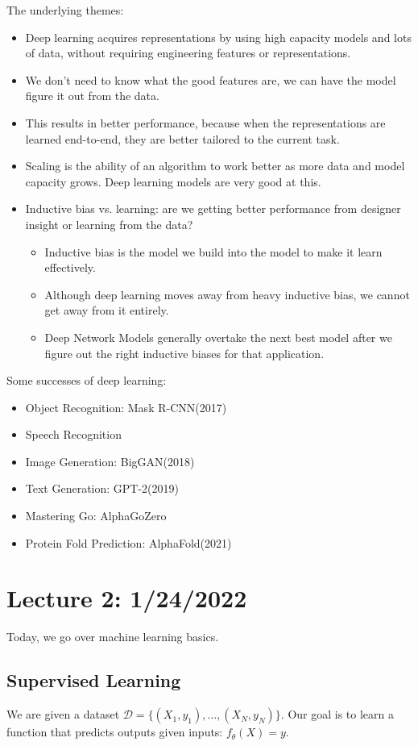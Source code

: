 \documentclass[11pt]{scrartcl}
\let \mc \mathcal
\newcommand{\1}{\textbf{1}} %
\begin{document}
The underlying themes:
\begin{itemize}
\item Deep learning acquires representations by using high capacity models and lots of data, without requiring engineering features or representations.
\item We don't need to know what the good features are, we can have the model figure it out from the data.
\item This results in better performance, because when the representations are learned end-to-end, they are better tailored to the current task.
\item Scaling is the ability of an algorithm to work better as more data and model capacity grows.  Deep learning models are very good at this.
\item Inductive bias vs. learning: are we getting better performance from designer insight or learning from the data? 
\begin{itemize}
\item Inductive bias is the model we build into the model to make it learn effectively.
\item Although deep learning moves away from heavy inductive bias, we cannot get away from it entirely.  
\item Deep Network Models generally overtake the next best model after we figure out the right inductive biases for that application.
\end{itemize}
\end{itemize}


Some successes of deep learning:
\begin{itemize}
\item Object Recognition: Mask R-CNN(2017)
\item Speech Recognition
\item Image Generation: BigGAN(2018)
\item Text Generation: GPT-2(2019)
\item Mastering Go: AlphaGoZero
\item Protein Fold Prediction: AlphaFold(2021)
\end{itemize}
\pagebreak
\section{Lecture 2: 1/24/2022}
Today, we go over machine learning basics.

\subsection{Supervised Learning}
We are given a dataset $\mc D = \{(X_1, y_1), \dots, (X_N, y_N)\}$.  Our goal is to learn a function that predicts outputs given inputs: $f_\theta(X) = y$.
\end{document}
